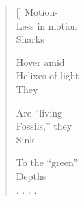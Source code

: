 \label{ch:sharks}
\settowidth{\versewidth}{                . . . .}
\begin{verse}[\versewidth]
     Motion-\\
Less in motion\\
              Sharks

     Hover amid\\
Helixes of light\\
              They

     Are ``living\\
Fossils,'' they\\
               Sink

     To the ``green''\\
Depths\\
                . . . .
\end{verse}
